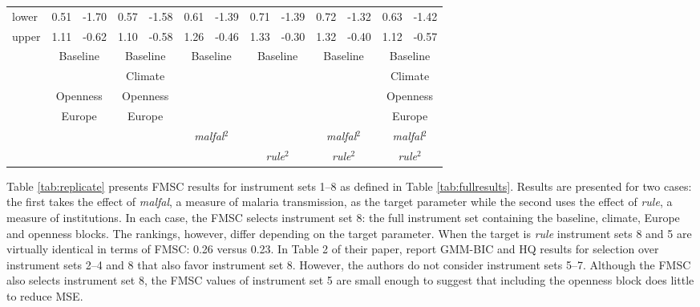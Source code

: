 \documentclass[12pt]{article}
\theoremstyle{definition}
\begin{document}
\begin{table}
\begin{center}
\begin{tabular}{lrrrrrrrrrrrr}
lower&0.51&-1.70&0.57&-1.58&0.61&-1.39&0.71&-1.39&0.72&-1.32&0.63&-1.42\tabularnewline
upper&1.11&-0.62&1.10&-0.58&1.26&-0.46&1.33&-0.30&1.32&-0.40&1.12&-0.57\tabularnewline
&\multicolumn{2}{c}{Baseline}&\multicolumn{2}{c}{Baseline}&\multicolumn{2}{c}{Baseline}&\multicolumn{2}{c}{Baseline}&\multicolumn{2}{c}{Baseline}&\multicolumn{2}{c}{Baseline}\tabularnewline
&&&\multicolumn{2}{c}{Climate}&&&&&&&\multicolumn{2}{c}{Climate}\tabularnewline
&\multicolumn{2}{c}{Openness}&\multicolumn{2}{c}{Openness}&& &&&&&\multicolumn{2}{c}{Openness}\tabularnewline
&\multicolumn{2}{c}{Europe}&\multicolumn{2}{c}{Europe}&& &&&&&\multicolumn{2}{c}{Europe}\tabularnewline
&&&&&\multicolumn{2}{c}{\emph{malfal}$^2$}&& &\multicolumn{2}{c}{\emph{malfal}$^2$}&\multicolumn{2}{c}{\emph{malfal}$^2$}\tabularnewline
&&&&&&&\multicolumn{2}{c}{\emph{rule}$^2$}&\multicolumn{2}{c}{\emph{rule}$^2$}&\multicolumn{2}{c}{\emph{rule}$^2$}\tabularnewline
\hline
\end{tabular}

\end{center}

\end{table}


Table \ref{tab:replicate} presents FMSC results for instrument sets 1--8  as defined in Table \ref{tab:fullresults}. Results are presented for two cases: the first takes the effect of \emph{malfal}, a measure of malaria transmission, as the target parameter while the second uses the effect of \emph{rule}, a measure of institutions. In each case, the FMSC selects instrument set 8: the full instrument set containing the baseline, climate, Europe and openness blocks. The rankings, however, differ depending on the target parameter.  When the target is \emph{rule} instrument sets 8 and 5 are virtually identical in terms of FMSC: 0.26 versus 0.23. In Table 2 of their paper, \cite{Carstensen2006} report GMM-BIC and HQ results for selection over instrument sets 2--4 and 8 that also favor instrument set 8. However, the authors do not consider instrument sets 5--7. Although the FMSC also selects instrument set 8, the FMSC values of instrument set 5 are small enough to suggest that including the openness block does little to reduce MSE.
\end{document}
